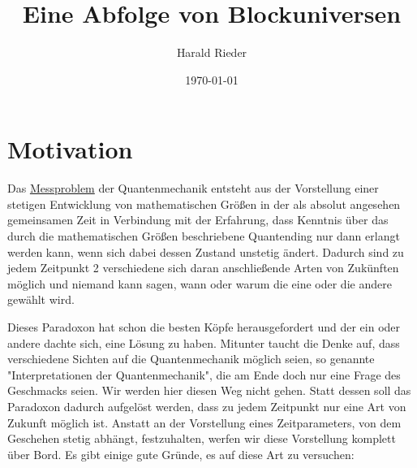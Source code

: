 \documentclass[12pt]{article}
\begin{document}
\title{\fontsize{25}{25}\selectfont \textbf{Eine Abfolge von Blockuniversen}}
\author{Harald Rieder}
\date{\today}
\maketitle



\tableofcontents

\section{Motivation}

Das \href{https://en.wikipedia.org/wiki/Measurement_problem}{Messproblem} der Quantenmechanik entsteht aus der Vorstellung einer stetigen Entwicklung von mathematischen Größen in der als absolut angesehen gemeinsamen Zeit in Verbindung mit der Erfahrung, dass Kenntnis über das durch die mathematischen Größen beschriebene Quantending nur dann erlangt werden kann, wenn sich dabei dessen Zustand unstetig ändert. Dadurch sind zu jedem Zeitpunkt 2 verschiedene sich daran anschließende Arten von Zukünften möglich und niemand kann sagen, wann oder warum die eine oder die andere gewählt wird. 

Dieses Paradoxon hat schon die besten Köpfe herausgefordert und der ein oder andere dachte sich, eine Lösung zu haben. Mitunter taucht die Denke auf, dass verschiedene Sichten auf die Quantenmechanik möglich seien, so genannte "Interpretationen der Quantenmechanik", die am Ende doch nur eine Frage des Geschmacks seien. Wir werden hier diesen Weg nicht gehen. Statt dessen soll das Paradoxon dadurch aufgelöst werden, dass zu jedem Zeitpunkt nur eine Art von Zukunft möglich ist. Anstatt an der Vorstellung eines Zeitparameters, von dem Geschehen stetig abhängt, festzuhalten, werfen wir diese Vorstellung komplett über Bord. Es gibt einige gute Gründe, es auf diese Art zu versuchen:
\end{document}
